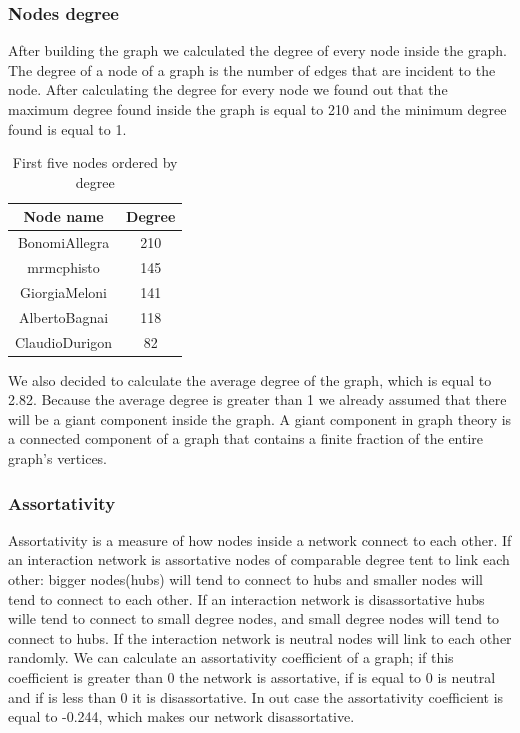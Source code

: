 \documentclass[12pt,journal,compsoc]{IEEEtran}
\begin{document}
\subsubsection{Nodes degree}
After building the graph we calculated the degree of every node inside the graph. The degree of a node of a graph is the number of edges that are incident to the node. After calculating the degree for every node we found out that the maximum degree found inside the graph is equal to 210 and the minimum degree found is equal to 1. 
\begin{table}[ht]
\centering
\begin{tabular}{c c }
	Node name & Degree  \\
	\hline
	BonomiAllegra & 210  \\
	mrmcphisto & 145  \\
	GiorgiaMeloni & 141  \\
	AlbertoBagnai & 118  \\
	ClaudioDurigon & 82  \\
\end{tabular}
\caption{First five nodes ordered by degree}
\end{table}
We also decided to calculate the average degree of the graph, which is equal to 2.82. Because the average degree is greater than 1 we already assumed that there will be a giant component inside the graph. A giant component in graph theory is a connected component of a graph that contains a finite fraction of the entire graph's vertices.

\subsubsection{Assortativity}
Assortativity is a measure of how nodes inside a network connect to each other. If an interaction network is assortative nodes of comparable degree tent to link each other: bigger nodes(hubs) will tend to connect to hubs and smaller nodes will tend to connect to each other. If an interaction network is disassortative hubs wille tend to connect to small degree nodes, and small degree nodes will tend to connect to hubs. If the interaction network is neutral nodes will link to each other randomly.
We can calculate an assortativity coefficient of a graph; if this coefficient is greater than 0 the network is assortative, if is equal to 0 is neutral and if is less than 0 it is disassortative.
In out case the assortativity coefficient is equal to -0.244, which makes our network disassortative.
\end{document}
